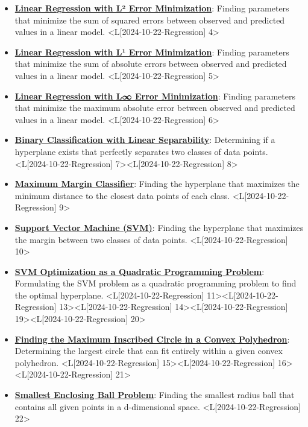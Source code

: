 \documentclass{article}%
\begin{document}
\begin{itemize}[[leftmargin=*]]%
\item \href{https://www.math.purdue.edu/~yipn/421/2024-10-22-Regression.pdf#page=4}{\textbf{Linear Regression with L² Error Minimization}}: Finding parameters that minimize the sum of squared errors between observed and predicted values in a linear model. <L[2024-10-22-Regression] 4>%
\item \href{https://www.math.purdue.edu/~yipn/421/2024-10-22-Regression.pdf#page=5}{\textbf{Linear Regression with L¹ Error Minimization}}: Finding parameters that minimize the sum of absolute errors between observed and predicted values in a linear model. <L[2024-10-22-Regression] 5>%
\item \href{https://www.math.purdue.edu/~yipn/421/2024-10-22-Regression.pdf#page=6}{\textbf{Linear Regression with L∞ Error Minimization}}: Finding parameters that minimize the maximum absolute error between observed and predicted values in a linear model. <L[2024-10-22-Regression] 6>%
\item \href{https://www.math.purdue.edu/~yipn/421/2024-10-22-Regression.pdf#page=7}{\textbf{Binary Classification with Linear Separability}}: Determining if a hyperplane exists that perfectly separates two classes of data points. <L[2024-10-22-Regression] 7><L[2024-10-22-Regression] 8>%
\item \href{https://www.math.purdue.edu/~yipn/421/2024-10-22-Regression.pdf#page=9}{\textbf{Maximum Margin Classifier}}: Finding the hyperplane that maximizes the minimum distance to the closest data points of each class. <L[2024-10-22-Regression] 9>%
\item \href{https://www.math.purdue.edu/~yipn/421/2024-10-22-Regression.pdf#page=10}{\textbf{Support Vector Machine (SVM)}}: Finding the hyperplane that maximizes the margin between two classes of data points. <L[2024-10-22-Regression] 10>%
\item \href{https://www.math.purdue.edu/~yipn/421/2024-10-22-Regression.pdf#page=11}{\textbf{SVM Optimization as a Quadratic Programming Problem}}: Formulating the SVM problem as a quadratic programming problem to find the optimal hyperplane. <L[2024-10-22-Regression] 11><L[2024-10-22-Regression] 13><L[2024-10-22-Regression] 14><L[2024-10-22-Regression] 19><L[2024-10-22-Regression] 20>%
\item \href{https://www.math.purdue.edu/~yipn/421/2024-10-22-Regression.pdf#page=15}{\textbf{Finding the Maximum Inscribed Circle in a Convex Polyhedron}}: Determining the largest circle that can fit entirely within a given convex polyhedron. <L[2024-10-22-Regression] 15><L[2024-10-22-Regression] 16><L[2024-10-22-Regression] 21>%
\item \href{https://www.math.purdue.edu/~yipn/421/2024-10-22-Regression.pdf#page=22}{\textbf{Smallest Enclosing Ball Problem}}: Finding the smallest radius ball that contains all given points in a d-dimensional space. <L[2024-10-22-Regression] 22>%
\end{itemize}%
\end{document}
